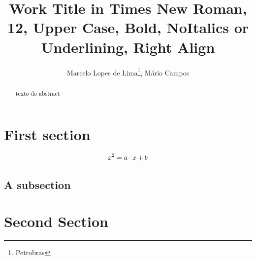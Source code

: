 \documentclass[a4paper, 10pt]{IBP}
\title{Work Title in Times New Roman, 12, Upper Case, Bold, NoItalics or Underlining, Right Align}
\author{
	Marcelo Lopes de Lima\thanks{Petrobras}, M\'ario Campos\samethanks %
}
\date{} 				%
\begin{document}
\maketitle

\begin{abstract}
texto do abstract
\end{abstract}

\section{First section}
\lipsum

\begin{equation}
	\displayindent=-0.5\linewidth
	x^2 = a \cdot x + b
\end{equation}

\subsection{A subsection}
\lipsum

\section{Second Section}
\lipsum
\cite{Curtis2004,Camponogara2002}

\printbibliography
\end{document}
